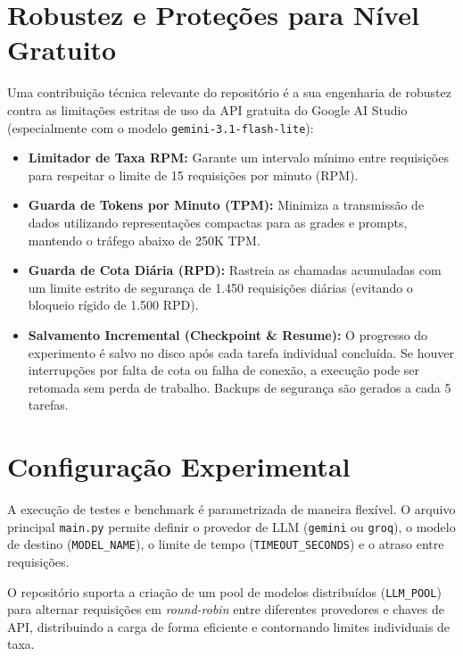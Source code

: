 \documentclass[letterpaper]{article} %
\begin{document}
\section{Robustez e Prote{\c{c}}{\~o}es para N{\'i}vel Gratuito}
Uma contribui{\c{c}}{\~a}o t{\'e}cnica relevante do reposit{\'o}rio {\'e} a sua engenharia de robustez contra as limita{\c{c}}{\~o}es estritas de uso da API gratuita do Google AI Studio (especialmente com o modelo \texttt{gemini-3.1-flash-lite}):
\begin{itemize}
    \item \textbf{Limitador de Taxa RPM:} Garante um intervalo m{\'i}nimo entre requisi{\c{c}}{\~o}es para respeitar o limite de 15 requisi{\c{c}}{\~o}es por minuto (RPM).
    \item \textbf{Guarda de Tokens por Minuto (TPM):} Minimiza a transmiss{\~a}o de dados utilizando representa{\c{c}}{\~o}es compactas para as grades e prompts, mantendo o tr{\'a}fego abaixo de 250K TPM.
    \item \textbf{Guarda de Cota Di{\'a}ria (RPD):} Rastreia as chamadas acumuladas com um limite estrito de seguran{\c{c}}a de 1.450 requisi{\c{c}}{\~o}es di{\'a}rias (evitando o bloqueio r{\'i}gido de 1.500 RPD).
    \item \textbf{Salvamento Incremental (Checkpoint \& Resume):} O progresso do experimento {\'e} salvo no disco ap{\'o}s cada tarefa individual conclu{\'i}da. Se houver interrup{\c{c}}{\~o}es por falta de cota ou falha de conex{\~a}o, a execu{\c{c}}{\~a}o pode ser retomada sem perda de trabalho. Backups de seguran{\c{c}}a s{\~a}o gerados a cada 5 tarefas.
\end{itemize}

\section{Configura{\c{c}}{\~a}o Experimental}
A execu{\c{c}}{\~a}o de testes e benchmark {\'e} parametrizada de maneira flex{\'i}vel. O arquivo principal \texttt{main.py} permite definir o provedor de LLM (\texttt{gemini} ou \texttt{groq}), o modelo de destino (\texttt{MODEL\_NAME}), o limite de tempo (\texttt{TIMEOUT\_SECONDS}) e o atraso entre requisi{\c{c}}{\~o}es. 

O reposit{\'o}rio suporta a cria{\c{c}}{\~a}o de um pool de modelos distribu{\'i}dos (\texttt{LLM\_POOL}) para alternar requisi{\c{c}}{\~o}es em \textit{round-robin} entre diferentes provedores e chaves de API, distribuindo a carga de forma eficiente e contornando limites individuais de taxa.
\end{document}
